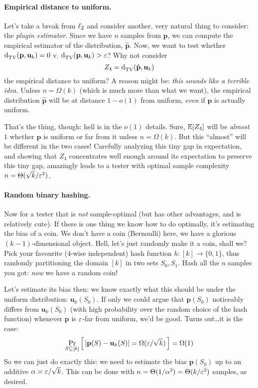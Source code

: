 \documentclass[10pt]{article}
\newcommand{\dst}{\eps}
\newcommand{\ab}{k}
\newcommand{\ns}{n}
\newcommand{\p}{\mathbf{p}}
\renewcommand{\uniform}{\mathbf{u}}
\begin{document}
\paragraph{Empirical distance to uniform.} Let's take a break from $\lp[2]$ and consider another, very natural thing to consider: the \emph{plugin estimator}. Since we have $\ns$ samples from $\p$, we can compute the empirical estimator of the distribution, $\hat{\p}$. Now, we want to test whether $\totalvardist{\p}{\uniform_\ab}=0$ v. $\totalvardist{\p}{\uniform_\ab}>\dst$? Why not consider 
\begin{equation}
    Z_4 = \totalvardist{\hat{\p}}{\uniform_\ab}
\end{equation}
the empirical distance to uniform? A reason might be: \emph{this sounds like a terrible idea.} Unless $\ns = \Omega(\ab)$ (which is much more than what we want), the empirical distribution $\hat{\p}$ will be at distance $1-o(1)$ from uniform, \emph{even} if $\p$ is actually uniform. 

That's the thing, though: hell is in the $o(1)$ details. Sure, $\expect{Z_4}$ will be \emph{almost} $1$ whether $\p$ is uniform or far from it unless $\ns = \Omega(\ab)$. But this ``almost'' will be different in the two cases! Carefully analyzing this tiny gap in expectation, and showing that $Z_4$ concentrates well enough around its expectation to preserve this tiny gap, amazingly leads to a tester with optimal sample complexity $\ns = \Theta(\sqrt{\ab}/\dst^2)$.

\paragraph{Random binary hashing.} Now for a tester that is \emph{not} sample-optimal (but has other advantages, and is relatively cute). If there is one thing we know how to do optimally, it's estimating the bias of a coin. We don't have a coin (Bernoulli) here, we have a glorious $(\ab-1)$-dimensional object.
Hell, let's just randomly make it a coin, shall we? Pick your favourite ($4$-wise independent) hash function $h\colon[\ab]\to\{0,1\}$, thus randomly partitioning the domain $[\ab]$ in two sets $S_0,S_1$. Hash all the $\ns$ samples you got: \emph{now} we have a random coin!

Let's estimate its bias then: we know exactly what this should be under the uniform distribution: $\uniform_\ab(S_0)$. If only we could argue that $\p(S_0)$ noticeably differs from $\uniform_\ab(S_0)$ (with high probability over the random choice of the hash function) whenever $\p$ is $\dst$-far from uniform, we'd be good. Turns out\dots it is the case:
\begin{equation}
    \probaDistrOf{S\subseteq [\ab]}{ |\p(S)-\uniform_\ab(S)| = \Omega(\dst/\sqrt{\ab}) } = \Omega(1)
\end{equation}
So we can just do exactly this: we need to estimate the bias $\p(S_0)$ up to an additive $\alpha \asymp \dst/\sqrt{\ab}$. This can be done with $\ns = \Theta(1/\alpha^2)= \Theta(\ab/\dst^2)$ samples, as desired.
\end{document}
